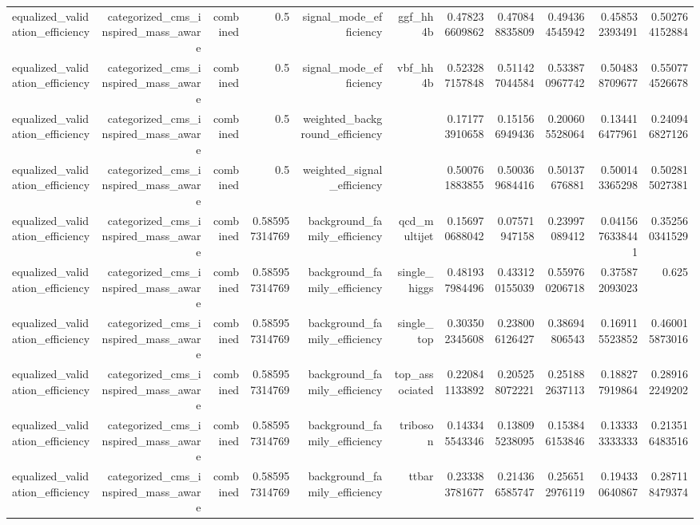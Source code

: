 \begin{table}[htbp]
{\begin{tabular}{lrrrrrrrrrr}
equalized\_validation\_efficiency & categorized\_cms\_inspired\_mass\_aware & combined & 0.5 & signal\_mode\_efficiency & ggf\_hh4b & 0.478236609862 & 0.470848835809 & 0.494364545942 & 0.458532393491 & 0.502764152884 \\
equalized\_validation\_efficiency & categorized\_cms\_inspired\_mass\_aware & combined & 0.5 & signal\_mode\_efficiency & vbf\_hh4b & 0.523287157848 & 0.511427044584 & 0.533870967742 & 0.504838709677 & 0.550774526678 \\
equalized\_validation\_efficiency & categorized\_cms\_inspired\_mass\_aware & combined & 0.5 & weighted\_background\_efficiency &  & 0.171773910658 & 0.151566949436 & 0.200605528064 & 0.134416477961 & 0.240946827126 \\
equalized\_validation\_efficiency & categorized\_cms\_inspired\_mass\_aware & combined & 0.5 & weighted\_signal\_efficiency &  & 0.500761883855 & 0.500369684416 & 0.50137676881 & 0.500143365298 & 0.502815027381 \\
equalized\_validation\_efficiency & categorized\_cms\_inspired\_mass\_aware & combined & 0.585957314769 & background\_family\_efficiency & qcd\_multijet & 0.156970688042 & 0.07571947158 & 0.23997089412 & 0.0415676338441 & 0.352560341529 \\
equalized\_validation\_efficiency & categorized\_cms\_inspired\_mass\_aware & combined & 0.585957314769 & background\_family\_efficiency & single\_higgs & 0.481937984496 & 0.433120155039 & 0.559760206718 & 0.375872093023 & 0.625 \\
equalized\_validation\_efficiency & categorized\_cms\_inspired\_mass\_aware & combined & 0.585957314769 & background\_family\_efficiency & single\_top & 0.303502345608 & 0.238006126427 & 0.38694806543 & 0.169115523852 & 0.460015873016 \\
equalized\_validation\_efficiency & categorized\_cms\_inspired\_mass\_aware & combined & 0.585957314769 & background\_family\_efficiency & top\_associated & 0.220841133892 & 0.205258072221 & 0.251882637113 & 0.188277919864 & 0.289162249202 \\
equalized\_validation\_efficiency & categorized\_cms\_inspired\_mass\_aware & combined & 0.585957314769 & background\_family\_efficiency & triboson & 0.143345543346 & 0.138095238095 & 0.153846153846 & 0.133333333333 & 0.213516483516 \\
equalized\_validation\_efficiency & categorized\_cms\_inspired\_mass\_aware & combined & 0.585957314769 & background\_family\_efficiency & ttbar & 0.233383781677 & 0.214366585747 & 0.256512976119 & 0.194330640867 & 0.287118479374 \\

\end{tabular}}
\end{table}

